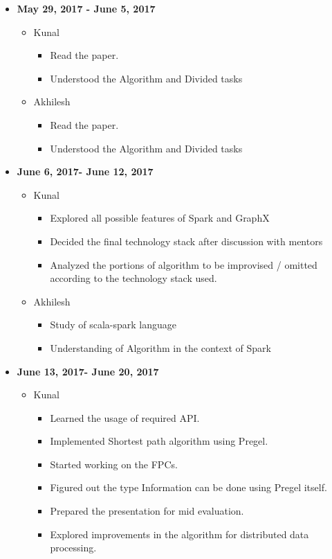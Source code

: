 \documentclass{easychair}
\begin{document}
\begin{itemize}
    \item \textbf{May 29, 2017 -  June 5, 2017}
    \begin{itemize}
    \item Kunal
    \begin{itemize}
    \item Read the paper.
\item Understood the Algorithm and Divided tasks
 \end{itemize}

 \item Akhilesh
  \begin{itemize}
   \item Read the paper.
\item Understood the Algorithm and Divided tasks
 \end{itemize}

    \end{itemize}

     \item \textbf{June 6, 2017- June 12, 2017}
    \begin{itemize}

    \item Kunal
    \begin{itemize}
    \item Explored all possible features of Spark and GraphX
\item Decided the final technology stack after discussion with mentors
\item Analyzed the portions of algorithm to be improvised / omitted according to the technology stack used.

 \end{itemize}

 \item Akhilesh
  \begin{itemize}
   \item Study of scala-spark language
   \item Understanding of Algorithm in the context of Spark


 \end{itemize}

    \end{itemize}

     \item \textbf{June 13, 2017- June 20, 2017}
    \begin{itemize}

    \item Kunal
    \begin{itemize}
    \item Learned the usage of required API.
\item Implemented Shortest path algorithm using Pregel.
\item Started working on the FPCs.
\item Figured out the type Information can be done using Pregel itself.
\item Prepared the presentation for mid evaluation.
\item Explored improvements in the algorithm for distributed data processing.


\end{itemize}
\end{itemize}
\end{itemize}
\end{document}
